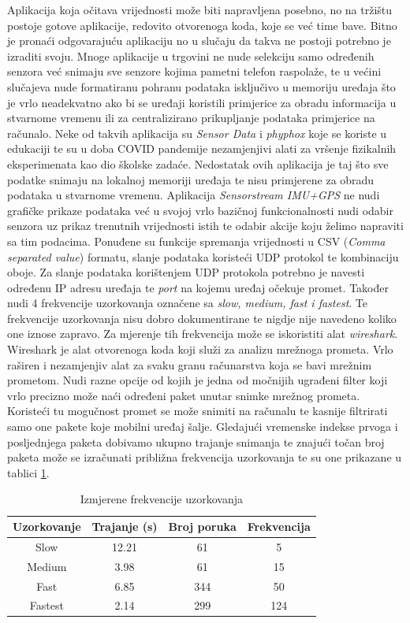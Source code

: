 \documentclass[times, utf8, diplomski]{fer}
\begin{document}
Aplikacija koja očitava vrijednosti može biti napravljena posebno, no na tržištu postoje gotove aplikacije, redovito otvorenoga koda, koje se već time bave.
Bitno je pronaći odgovarajuću aplikaciju no u slučaju da takva ne postoji potrebno je izraditi svoju. Mnoge aplikacije u trgovini ne nude selekciju samo određenih senzora
već snimaju sve senzore kojima pametni telefon raspolaže, te u većini slučajeva nude formatiranu pohranu podataka isključivo u memoriju uređaja što je vrlo neadekvatno ako bi se uređaji
koristili primjerice za obradu informacija u stvarnome vremenu ili za centralizirano prikupljanje podataka primjerice na računalo. Neke od takvih aplikacija su
\textit{Sensor Data} i \textit{phyphox} koje se koriste u edukaciji te su u doba COVID pandemije nezamjenjivi alati za vršenje fizikalnih eksperimenata kao dio
školske zadaće. Nedostatak ovih aplikacija je taj što sve podatke snimaju na lokalnoj memoriji uređaja te nisu primjerene za obradu podataka u stvarnome vremenu.
Aplikacija \textit{Sensorstream IMU+GPS} ne nudi grafičke prikaze podataka već u svojoj vrlo bazičnoj funkcionalnosti nudi odabir senzora uz prikaz trenutnih
vrijednosti istih te odabir akcije koju želimo napraviti sa tim podacima. Ponuđene su funkcije spremanja vrijednosti u CSV (\textit{Comma separated value}) formatu,
slanje podataka koristeći UDP protokol te kombinaciju oboje. Za slanje podataka korištenjem UDP protokola potrebno je navesti određenu IP adresu uređaja te \textit{port} na
kojemu uređaj očekuje promet. Također nudi 4 frekvencije uzorkovanja označene sa \textit{slow, medium, fast i fastest}. Te frekvencije uzorkovanja nisu dobro dokumentirane
te nigdje nije navedeno koliko one iznose zapravo. Za mjerenje tih frekvencija može se iskoristiti alat \textit{wireshark}. Wireshark je alat otvorenoga koda koji
služi za analizu mrežnoga prometa. Vrlo raširen i nezamjenjiv alat za svaku granu računarstva koja se bavi mrežnim prometom. Nudi razne opcije od kojih je jedna 
od močnijih ugrađeni filter koji vrlo precizno može naći određeni paket unutar snimke mrežnog prometa. Koristeći tu mogučnost promet se može snimiti na računalu
te kasnije filtrirati samo one pakete koje mobilni uređaj šalje. Gledajući vremenske indekse prvoga i posljednjega paketa dobivamo ukupno trajanje
snimanja te znajući točan broj paketa može se izračunati približna frekvencija uzorkovanja te su one prikazane u tablici \ref{frekvencije}.

\begin{table} [h!]
 \centering
    \begin{tabular}{|c|c|c|c|}
        \hline
        Uzorkovanje & Trajanje (s) & Broj poruka & Frekvencija \\
        \hline
        Slow & 12.21 & 61 & 5 \\
        Medium & 3.98 & 61 & 15 \\
        Fast & 6.85 & 344 & 50 \\
        Fastest & 2.14 & 299 & 124\\
        \hline
    \end{tabular}
    \caption{Izmjerene frekvencije uzorkovanja}
    \label{frekvencije}
\end{table}
\end{document}
